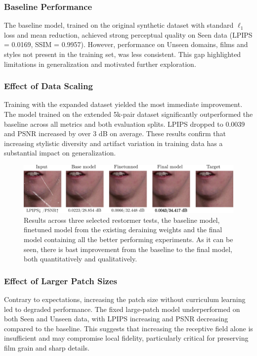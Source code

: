 \documentclass[10pt,a4paper,twocolumn,twoside]{article}
\begin{document}
\subsubsection{Baseline Performance}

The baseline model, trained on the original synthetic dataset with standard $\ell_1$ loss and mean reduction, achieved strong perceptual quality on Seen data (LPIPS = 0.0169, SSIM = 0.9957). However, performance on Unseen domains, films and styles not present in the training set, was less consistent. This gap highlighted limitations in generalization and motivated further exploration.

\subsubsection{Effect of Data Scaling}

Training with the expanded dataset yielded the most immediate improvement. The model trained on the extended 5k-pair dataset significantly outperformed the baseline across all metrics and both evaluation splits. LPIPS dropped to 0.0039 and PSNR increased by over 3 dB on average. These results confirm that increasing stylistic diversity and artifact variation in training data has a substantial impact on generalization.
\begin{figure}[t]
    \centering
    \includegraphics[width= \textwidth]{img/comparason_restormer.pdf}\vspace{-0.6em}
    \caption{\small Results across three selected restormer tests, the baseline model, finetuned model from the existing deraining weights and the final model containing all the better performing experiments. As it can be seen, there is bast improvement from the baseline to the final model, both quantitatively and qualitatively.}
    \label{fig:comparason_restormer}
    \vspace{-1em}
\end{figure}
\subsubsection{Effect of Larger Patch Sizes}

Contrary to expectations, increasing the patch size without curriculum learning led to degraded performance. The fixed large-patch model underperformed on both Seen and Unseen data, with LPIPS increasing and PSNR decreasing compared to the baseline. This suggests that increasing the receptive field alone is insufficient and may compromise local fidelity, particularly critical for preserving film grain and sharp details.
\end{document}
